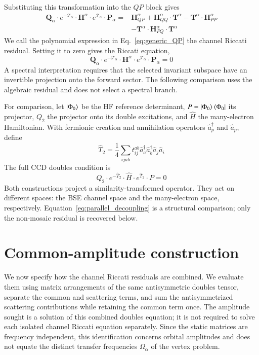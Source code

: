 \documentclass[aip,jcp,reprint,noshowkeys,superscriptaddress]{revtex4-1}
\newcommand{\cre}[1]{\hat{a}_{#1}^{\dagger}}
\newcommand{\ani}[1]{\hat{a}_{#1}}
\newcommand{\bT}{\boldsymbol{T}}
\newcommand{\bH}{\boldsymbol{H}}
\newcommand{\bP}{\boldsymbol{P}}
\newcommand{\bQ}{\boldsymbol{Q}}
\newcommand{\bcalT}{\boldsymbol{\mathcal{T}}}
\begin{document}
Substituting this transformation into the $QP$ block gives
\begin{align}
    \bQ_{\alpha}\cdot e^{-\bcalT_{\alpha}}\cdot \bH^{\alpha}\cdot e^{\bcalT_{\alpha}}\cdot \bP_{\alpha}
    ={}&
    \bH_{QP}^{\alpha}
    +\bH_{QQ}^{\alpha}\cdot \bT^{\alpha}
    -\bT^{\alpha}\cdot \bH_{PP}^{\alpha}
    \nonumber\\
    &-\bT^{\alpha}\cdot \bH_{PQ}^{\alpha}\cdot \bT^{\alpha}
    \label{eq:generic_QP}
\end{align}
We call the polynomial expression in Eq.~\eqref{eq:generic_QP} the
channel Riccati residual. Setting it to zero gives the Riccati equation,
\begin{equation}
    \bQ_{\alpha}\cdot e^{-\bcalT_{\alpha}}\cdot \bH^{\alpha}\cdot e^{\bcalT_{\alpha}}\cdot \bP_{\alpha}=0
\label{eq:BSE_decoupling}
\end{equation}
A spectral interpretation requires that the selected invariant subspace
have an invertible projection onto the forward sector. The following
comparison uses the algebraic residual and does not select a spectral branch.

For comparison, let $\ket{\Phi_0}$ be the HF reference determinant,
$P=\ket{\Phi_0}\bra{\Phi_0}$ its projector, $Q_2$ the projector onto its
double excitations, and $\hat H$ the many-electron Hamiltonian. With fermionic
creation and annihilation operators $\cre{p}$ and $\ani{p}$, define
\begin{equation*}
 \hat T_2=\frac14\sum_{ijab}t_{ij}^{ab}\cre{a}\cre{b}\ani{j}\ani{i}
\end{equation*}
The full CCD doubles condition is\cite{Shavitt2009}
\begin{equation}
 Q_2\cdot e^{-\hat T_2}\cdot\hat H\cdot e^{\hat T_2}\cdot P=0
 \label{eq:parallel_decoupling}
\end{equation}
Both constructions project a similarity-transformed operator. They act on
different spaces: the BSE channel space and the many-electron space,
respectively. Equation~\eqref{eq:parallel_decoupling} is a structural comparison;
only the non-mosaic residual is recovered below.

\section{Common-amplitude construction}
\label{sec:common_t}

We now specify how the channel Riccati residuals are combined. We evaluate
them using matrix arrangements of the same antisymmetric doubles tensor,
separate the common and scattering terms, and sum the antisymmetrized
scattering contributions while retaining the common term once. The amplitude
sought is a solution of this combined doubles equation; it is not required
to solve each isolated channel Riccati equation separately. Since the
static matrices are frequency independent, this identification concerns
orbital amplitudes and does not equate the distinct transfer frequencies
$\Omega_{\alpha}$ of the vertex problem.
\end{document}

